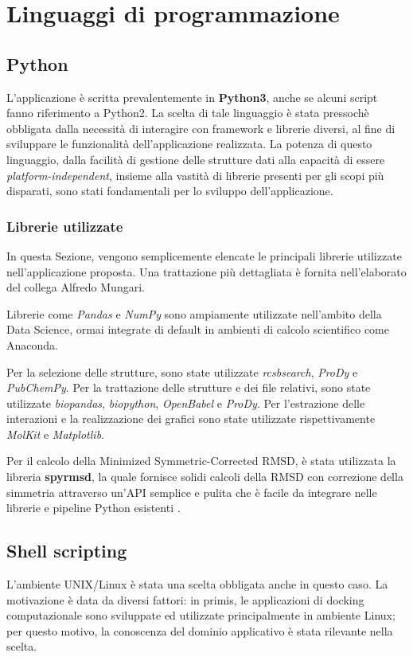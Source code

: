 \section{Linguaggi di programmazione}
\subsection{Python}
L'applicazione è scritta prevalentemente in \textbf{Python3}, anche se alcuni script fanno riferimento a Python2. La scelta di tale linguaggio è stata pressochè obbligata dalla necessità di interagire con framework e librerie diversi, al fine di sviluppare le funzionalità dell'applicazione realizzata.
La potenza di questo linguaggio, dalla facilità di gestione delle strutture dati alla capacità di essere \textit{platform-independent}, insieme alla vastità di librerie presenti per gli scopi più disparati, sono stati fondamentali per lo sviluppo dell'applicazione.

\subsubsection{Librerie utilizzate}
In questa Sezione, vengono semplicemente elencate le principali librerie utilizzate nell'applicazione proposta. Una trattazione più dettagliata è fornita nell'elaborato del collega Alfredo Mungari.

Librerie come \textit{Pandas} e \textit{NumPy} sono ampiamente utilizzate nell'ambito della Data Science, ormai integrate di default in ambienti di calcolo scientifico come Anaconda.

Per la selezione delle strutture, sono state utilizzate \textit{rcsbsearch}, \textit{ProDy} e \textit{PubChemPy}.
Per la trattazione delle strutture e dei file relativi, sono state utilizzate \textit{biopandas}, \textit{biopython}, \textit{OpenBabel} e \textit{ProDy}.
Per l'estrazione delle interazioni e la realizzazione dei grafici sono state utilizzate rispettivamente \textit{MolKit} e \textit{Matplotlib}.

Per il calcolo della Minimized Symmetric-Corrected RMSD, è stata utilizzata la libreria \textbf{spyrmsd}, la quale fornisce solidi calcoli della RMSD con correzione della simmetria attraverso un'API semplice e pulita che è facile da integrare nelle librerie e pipeline Python esistenti \cite{meli_spyrmsd_2020}.


\subsection{Shell scripting}
L'ambiente UNIX/Linux è stata una scelta obbligata anche in questo caso. La motivazione è data da diversi fattori: in primis, le applicazioni di docking computazionale sono sviluppate ed utilizzate principalmente in ambiente Linux; per questo motivo, la conoscenza del dominio applicativo è stata rilevante nella scelta. 

